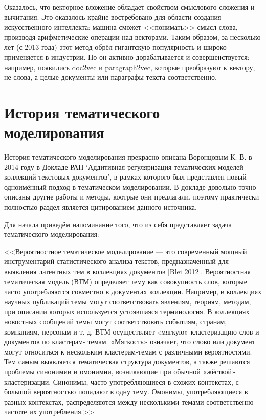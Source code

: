 \documentclass[a4paper,14pt]{extarticle}
\begin{document}
Оказалось, что векторное вложение обладает свойством смыслового сложения и вычитания. Это оказалось крайне востребовано для области создания искусственного интеллекта: машина сможет <<понимать>> смысл слова, производя арифметические операции над векторами. Таким образом, за несколько лет (с 2013 года) этот метод обрёл гигантскую популярность и широко применяется в индустрии. Но он активно дорабатывается и совершенствуется: например, появились doc2vec и paragraph2vec, которые преобразуют к вектору, не слова, а целые документы или параграфы текста соответственно.
\section{История тематического моделирования}
История тематического моделирования прекрасно описана Воронцовым К. В. в 2014 году в Докладе РАН `Аддитивная регуляризация тематических моделей коллекций текстовых документов', в рамках которого был представлен новый одноимённый подход в тематическом моделировании.  В докладе довольно точно описаны другие работы и методы, коотрые они предлагали, поэтому практически полностью раздел является цитированием данного источника.

Для начала приведём напоминание того, что из себя представляет задача тематического моделирования:

<<Вероятностное тематическое моделирование ---
это современный мощный инструментарий статистического анализа текстов,
предназначенный для выявления латентных тем в коллекциях документов [Blei
2012]. Вероятностная тематическая модель (ВТМ) определяет тему как
совокупность слов, которые часто употребляются совместно в документах
коллекции. Например, в коллекциях научных публикаций темы могут
соответствовать явлениям, теориям, методам, при описании которых используется
устоявшаяся терминология. В коллекциях новостных сообщений темы могут
соответствовать событиям, странам, компаниям, персонам и т. д.
ВТМ осуществляет «мягкую» кластеризацию слов и документов по кластерам-
темам. «Мягкость» означает, что слово или документ могут относиться к
нескольким кластерам-темам с различными вероятностями. Тем самым выявляется
тематическая структура документов, а также решаются проблемы синонимии и
омонимии, возникающие при обычной «жёсткой» кластеризации. Синонимы, часто
употребляющиеся в схожих контекстах, с большой вероятностью попадают в одну
тему. Омонимы, употребляющиеся в разных контекстах, распределяются между
несколькими темами соответственно частоте их употребления.>>
\end{document}
